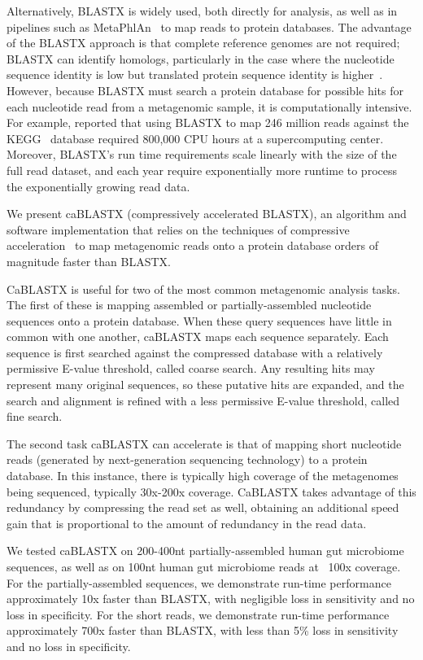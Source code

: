 \documentclass{amsbook}
\theoremstyle{definition}
\theoremstyle{remark}
\numberwithin{equation}{section}
\begin{document}
Alternatively, BLASTX is widely used, both directly for analysis, as well as in 
pipelines such as MetaPhlAn~\cite{Huttenhower} to map reads to protein 
databases.
The advantage of the BLASTX approach is that complete reference genomes are not
required; BLASTX can identify homologs, particularly in the case where the
nucleotide sequence identity is low but translated protein sequence identity
is higher~\cite{Turnbaugh:2006, Kurokawa:2007}.
However, because BLASTX must search a protein database for possible hits for
each nucleotide read from a metagenomic sample, it is computationally intensive.
For example, \citet{Mackelprang:2011} reported that using BLASTX to map 246
million reads against the KEGG~\cite{kegg} database required 800,000 CPU hours
at a supercomputing center.
Moreover, BLASTX's run time requirements scale linearly with the size of the 
full read dataset, and each year require exponentially more runtime to process 
the exponentially growing read data. 


We present caBLASTX (compressively accelerated BLASTX), an algorithm and 
software implementation that relies on the techniques of compressive 
acceleration~\cite{Loh, Daniels} to map metagenomic reads onto a protein 
database orders of magnitude faster than BLASTX.

CaBLASTX is useful for two of the most common metagenomic analysis tasks. 
The first of these is mapping assembled or partially-assembled
nucleotide sequences onto a protein database. 
When these query sequences have
little in common with one another, caBLASTX maps each sequence separately. 
Each sequence is first searched against the compressed database with a 
relatively permissive E-value threshold, called coarse search. 
Any resulting hits may represent many original sequences, so these putative 
hits are expanded, and the search and alignment is refined with a less 
permissive E-value threshold, called fine search.

The second task caBLASTX can accelerate is that of mapping short nucleotide
reads (generated by next-generation sequencing technology) to a protein
database. In this instance, there is typically high coverage of the metagenomes
being sequenced, typically 30x-200x coverage. CaBLASTX takes advantage of this
redundancy
by compressing the read set as well, obtaining an additional speed gain that is
proportional to the amount of redundancy in the read data.


We tested caBLASTX on 200-400nt partially-assembled human gut microbiome
sequences, as well as on 100nt human gut microbiome reads at ~100x coverage.
For the partially-assembled sequences, we demonstrate run-time performance
approximately 10x faster than BLASTX, with negligible loss in sensitivity and
no loss in specificity. For the short reads, we demonstrate run-time
performance approximately 700x faster than BLASTX, with less than 5\% loss in
sensitivity and no loss in specificity.
\end{document}
